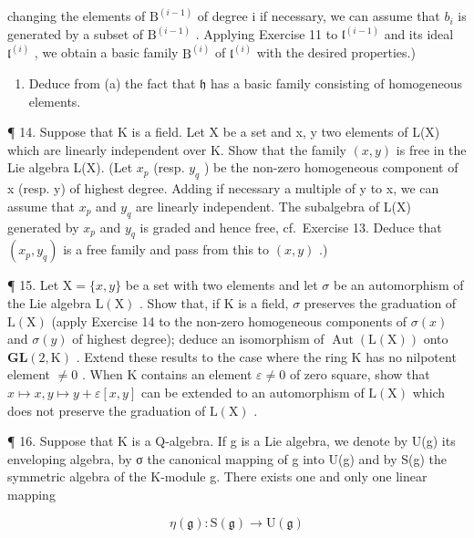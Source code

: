 changing the elements of \(\mathrm{B}^{(i-1)}\) of degree i if necessary, we can assume that \(b_{i}\) is generated by a subset of \(\mathrm{B}^{(i-1)}\) . Applying Exercise 11 to \(\mathfrak{l}^{(i-1)}\) and its ideal \(\mathfrak{l}^{(i)}\) , we obtain a basic family \(\mathrm{B}^{(i)}\) of \(\mathfrak{l}^{(i)}\) with the desired properties.)

\begin{enumerate}
\def\labelenumi{(\alph{enumi})}
\setcounter{enumi}{1}
\tightlist
\item
  Deduce from (a) the fact that \(\mathfrak{h}\) has a basic family consisting of homogeneous elements.
\end{enumerate}

¶ 14. Suppose that K is a field. Let X be a set and x, y two elements of L(X) which are linearly independent over K. Show that the family \((x,y)\) is free in the Lie algebra L(X). (Let \(x_{p}\) (resp. \(y_{q}\) ) be the non-zero homogeneous component of x (resp. y) of highest degree. Adding if necessary a multiple of y to x, we can assume that \(x_{p}\) and \(y_{q}\) are linearly independent. The subalgebra of L(X) generated by \(x_{p}\) and \(y_{q}\) is graded and hence free, cf.~Exercise 13. Deduce that \((x_{p},y_{q})\) is a free family and pass from this to \((x,y)\) .)

¶ 15. Let \(\mathrm{X} = \{x, y\}\) be a set with two elements and let \(\sigma\) be an automorphism of the Lie algebra \(\mathrm{L}(\mathrm{X})\) . Show that, if \(\mathrm{K}\) is a field, \(\sigma\) preserves the graduation of \(\mathrm{L}(\mathrm{X})\) (apply Exercise 14 to the non-zero homogeneous components of \(\sigma(x)\) and \(\sigma(y)\) of highest degree); deduce an isomorphism of \(\operatorname{Aut}(\mathrm{L}(\mathrm{X}))\) onto \(\mathbf{GL}(2, \mathrm{K})\) . Extend these results to the case where the ring \(\mathrm{K}\) has no nilpotent element \(\neq 0\) . When \(\mathrm{K}\) contains an element \(\varepsilon \neq 0\) of zero square, show that \(x \mapsto x, y \mapsto y + \varepsilon[x, y]\) can be extended to an automorphism of \(\mathrm{L}(\mathrm{X})\) which does not preserve the graduation of \(\mathrm{L}(\mathrm{X})\) .

¶ 16. Suppose that K is a Q-algebra. If g is a Lie algebra, we denote by U(g) its enveloping algebra, by σ the canonical mapping of g into U(g) and by S(g) the symmetric algebra of the K-module g. There exists one and only one linear mapping

\[
\eta (\mathfrak {g}): \mathrm{S} (\mathfrak {g}) \rightarrow \mathrm{U} (\mathfrak {g})
\]

